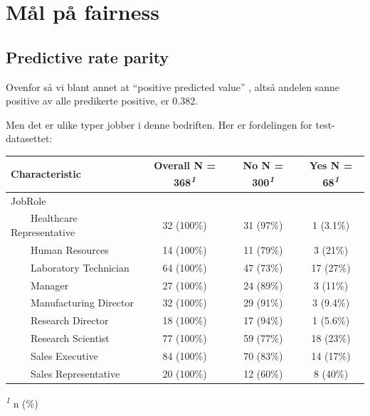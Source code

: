 \documentclass[
  letterpaper,
  DIV=11,
  numbers=noendperiod]{scrreprt}
\begin{document}
\section{Mål på fairness}\label{muxe5l-puxe5-fairness}

\subsection{Predictive rate parity}\label{predictive-rate-parity}

Ovenfor så vi blant annet at ``positive predicted value'' , altså
andelen sanne positive av alle predikerte positive, er 0.382.

Men det er ulike typer jobber i denne bedriften. Her er fordelingen for
test-datasettet:

\begin{table}
\fontsize{12.0pt}{14.0pt}\selectfont
\begin{tabular*}{\linewidth}{@{\extracolsep{\fill}}lccc}
\toprule
\textbf{Characteristic} & \textbf{Overall}  N = 368\textsuperscript{\textit{1}} & \textbf{No}  N = 300\textsuperscript{\textit{1}} & \textbf{Yes}  N = 68\textsuperscript{\textit{1}} \\ 
\midrule\addlinespace[2.5pt]
JobRole &  &  &  \\ 
    Healthcare Representative & 32 (100\%) & 31 (97\%) & 1 (3.1\%) \\ 
    Human Resources & 14 (100\%) & 11 (79\%) & 3 (21\%) \\ 
    Laboratory Technician & 64 (100\%) & 47 (73\%) & 17 (27\%) \\ 
    Manager & 27 (100\%) & 24 (89\%) & 3 (11\%) \\ 
    Manufacturing Director & 32 (100\%) & 29 (91\%) & 3 (9.4\%) \\ 
    Research Director & 18 (100\%) & 17 (94\%) & 1 (5.6\%) \\ 
    Research Scientist & 77 (100\%) & 59 (77\%) & 18 (23\%) \\ 
    Sales Executive & 84 (100\%) & 70 (83\%) & 14 (17\%) \\ 
    Sales Representative & 20 (100\%) & 12 (60\%) & 8 (40\%) \\ 
\bottomrule
\end{tabular*}
\begin{minipage}{\linewidth}
\vspace{.05em}
\textsuperscript{\textit{1}} n (\%)\\
\end{minipage}
\end{table}
\end{document}
